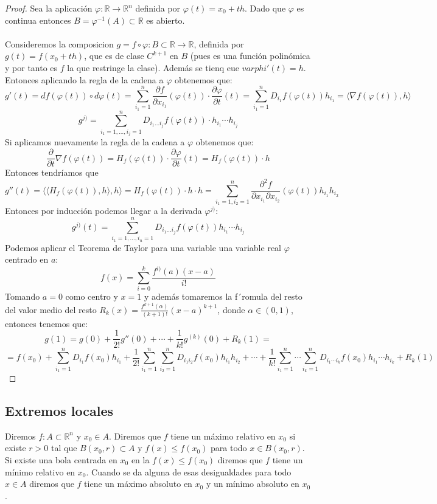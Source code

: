 \begin{proof}
    Sea la aplicación $\varphi:\mathbb{R} \to \mathbb{R}^n$ definida por $\varphi(t) = x_0 + th$. Dado que $\varphi$ es continua entonces $B = \varphi^{-1}(A) \subset \mathbb{R}$ es abierto. \\\\
    Consideremos la composicion $g =  f \circ \varphi: B \subset \mathbb{R} \to \mathbb{R}$, definida por $g(t) = f(x_0 + th)$, que es de clase $C^{k+1}$ en $B$ (pues es una función polinómica y por tanto es $f$ la que restringe la clase). Además se tienq eue $varphi'(t) = h$. Entonces aplicando la regla de la cadena a $\varphi$ obtenemos que: 
    $$g'(t) = df(\varphi(t)) \circ d\varphi(t) = \sum_{i_1 = 1}^{n} \frac{\partial f}{\partial x_{i_1}}(\varphi(t)) \cdot \frac{\partial \varphi}{\partial t}(t) = \sum_{i_1 = 1}^{n} D_{i_1}f(\varphi(t)) h_{i_1} = \langle \nabla f(\varphi(t)), h \rangle$$
    $$ g^{j)} = \sum_{i_1 = 1, \ldots, i_j = 1}^{n} D_{i_1 \ldots i_j}f(\varphi(t)) \cdot h_{i_1} \cdots h_{i_j}$$
    Si aplicamos nuevamente la regla de la cadena a $\varphi$ obtenemos que: 
    $$\frac{\partial}{\partial t} \nabla f(\varphi(t)) = H_f(\varphi(t)) \cdot \frac{\partial \varphi}{\partial t}(t) = H_f(\varphi(t)) \cdot h$$
    Entonces tendríamos que $$g''(t) = \langle \langle H_f(\varphi(t)), h \rangle, h \rangle = H_f(\varphi(t)) \cdot h \cdot h = \sum_{i_1 = 1, i_2 = 1}^{n} \frac{\partial^2 f}{\partial x_{i_1} \partial x_{i_2}}(\varphi(t)) h_{i_1} h_{i_2}$$
    Entonces por inducción podemos llegar a la derivada $\varphi^{j)}$:
    $$g^{j)}(t) = \sum_{i_1 = 1, \ldots, i_n = 1}^{n} D_{i_1 \ldots i_j}f(\varphi(t)) h_{i_1} \cdots h_{i_j}$$
    Podemos aplicar el Teorema de Taylor para una variable una variable real $\varphi$ centrado en $a$: 
    $$f(x) = \sum_{i = 0}^{k} \frac{f^{i)}(a)(x - a)}{i!}$$
    Tomando $a = 0$ como centro y $x = 1$ y además tomaremos la f´romula del resto del valor medio del resto $R_k(x) = \frac{f^{k+1}(\alpha)}{(k+1)!}(x - a)^{k+1}$, donde $\alpha \in (0,1)$, entonces tenemos que: 
    $$g(1) = g(0) + \frac{1}{2!} g''(0) + \cdots + \frac{1}{k!} g^{(k)}(0) + R_k(1) = $$
    $$ = f(x_0) + \sum_{i_1=1}^n D_{i_1}f(x_0) h_{i_1} + \frac{1}{2!} \sum_{i_1=1}^n \sum_{i_2=1}^n D_{i_1 i_2}f(x_0) h_{i_1} h_{i_2} + \cdots + \frac{1}{k!} \sum_{i_1=1}^n \cdots \sum_{i_k=1}^n D_{i_1 \cdots i_k}f(x_0) h_{i_1} \cdots h_{i_k} + R_k(1)$$

\end{proof}

\subsection{Extremos locales}
\begin{definición}
    Diremos $f: A \subset \mathbb{R}^n$ y $x_0 \in A$. Diremos que $f$ tiene un máximo relativo en $x_0$ si existe $r > 0$ tal que $B(x_0, r) \subset A$ y $f(x) \leq f(x_0)$ para todo $x \in B(x_0, r)$. Si existe una bola centrada en $x_0$ en la $f(x) \leq f(x_0)$ diremos que $f$ tiene un mínimo relativo en $x_0$. Cuando se da alguna de esas desigualdades para todo $x \in A$ diremos que $f$ tiene un máximo absoluto en $x_0$ y un mínimo absoluto en $x_0$.
\end{definición}

